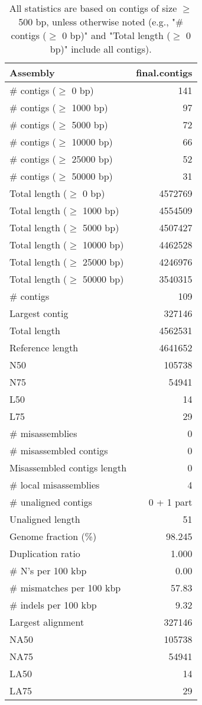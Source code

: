 \documentclass[12pt,a4paper]{article}
\begin{document}
\begin{table}[ht]
\begin{center}
\caption{All statistics are based on contigs of size $\geq$ 500 bp, unless otherwise noted (e.g., "\# contigs ($\geq$ 0 bp)" and "Total length ($\geq$ 0 bp)" include all contigs).}
\begin{tabular}{|l*{1}{|r}|}
\hline
Assembly & final.contigs \\ \hline
\# contigs ($\geq$ 0 bp) & 141 \\ \hline
\# contigs ($\geq$ 1000 bp) & 97 \\ \hline
\# contigs ($\geq$ 5000 bp) & 72 \\ \hline
\# contigs ($\geq$ 10000 bp) & 66 \\ \hline
\# contigs ($\geq$ 25000 bp) & 52 \\ \hline
\# contigs ($\geq$ 50000 bp) & 31 \\ \hline
Total length ($\geq$ 0 bp) & 4572769 \\ \hline
Total length ($\geq$ 1000 bp) & 4554509 \\ \hline
Total length ($\geq$ 5000 bp) & 4507427 \\ \hline
Total length ($\geq$ 10000 bp) & 4462528 \\ \hline
Total length ($\geq$ 25000 bp) & 4246976 \\ \hline
Total length ($\geq$ 50000 bp) & 3540315 \\ \hline
\# contigs & 109 \\ \hline
Largest contig & 327146 \\ \hline
Total length & 4562531 \\ \hline
Reference length & 4641652 \\ \hline
N50 & 105738 \\ \hline
N75 & 54941 \\ \hline
L50 & 14 \\ \hline
L75 & 29 \\ \hline
\# misassemblies & 0 \\ \hline
\# misassembled contigs & 0 \\ \hline
Misassembled contigs length & 0 \\ \hline
\# local misassemblies & 4 \\ \hline
\# unaligned contigs & 0 + 1 part \\ \hline
Unaligned length & 51 \\ \hline
Genome fraction (\%) & 98.245 \\ \hline
Duplication ratio & 1.000 \\ \hline
\# N's per 100 kbp & 0.00 \\ \hline
\# mismatches per 100 kbp & 57.83 \\ \hline
\# indels per 100 kbp & 9.32 \\ \hline
Largest alignment & 327146 \\ \hline
NA50 & 105738 \\ \hline
NA75 & 54941 \\ \hline
LA50 & 14 \\ \hline
LA75 & 29 \\ \hline
\end{tabular}
\end{center}
\end{table}
\end{document}
